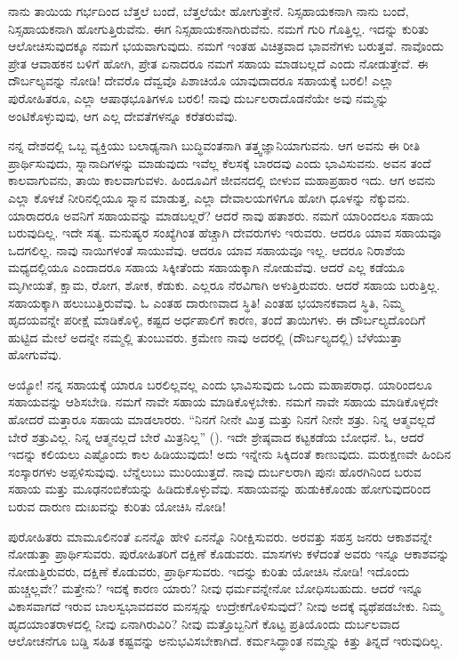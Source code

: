 ನಾನು ತಾಯಿಯ ಗರ್ಭದಿಂದ ಬೆತ್ತಲೆ ಬಂದೆ, ಬೆತ್ತಲೆಯೇ ಹೋಗುತ್ತೇನೆ. ನಿಸ್ಸಹಾಯಕನಾಗಿ ನಾನು ಬಂದೆ, ನಿಸ್ಸಹಾಯಕನಾಗಿ ಹೋಗುತ್ತಿರುವೆನು. ಈಗ ನಿಸ್ಸಹಾಯಕನಾಗಿರುವೆನು. ನಮಗೆ ಗುರಿ ಗೊತ್ತಿಲ್ಲ. ಇದನ್ನು ಕುರಿತು ಆಲೋಚಿಸುವುದಕ್ಕೂ ನಮಗೆ ಭಯವಾಗುವುದು. ನಮಗೆ ಇಂತಹ ವಿಚಿತ್ರವಾದ ಭಾವನೆಗಳು ಬರುತ್ತವೆ. ನಾವೊಂದು ಪ್ರೇತ ಆವಾಹಕನ ಬಳಿಗೆ ಹೋಗಿ, ಪ್ರೇತ ಏನಾದರೂ ನಮಗೆ ಸಹಾಯ ಮಾಡಬಲ್ಲದೆ ಎಂದು ನೋಡುತ್ತೇವೆ. ಈ ದೌರ್ಬಲ್ಯವನ್ನು ನೋಡಿ! ದೇವರೊ ದೆವ್ವವೊ ಪಿಶಾಚಿಯೊ ಯಾವುದಾದರೂ ಸಹಾಯಕ್ಕೆ ಬರಲಿ! ಎಲ್ಲಾ ಪುರೋಹಿತರೂ, ಎಲ್ಲಾ ಆಷಾಢಭೂತಿಗಳೂ ಬರಲಿ! ನಾವು ದುರ್ಬಲರಾದೊಡನೆಯೇ ಅವು ನಮ್ಮನ್ನು ಅಂಟಿಕೊಳ್ಳುವುವು, ಆಗ ಎಲ್ಲ ದೇವತೆಗಳನ್ನೂ ಕರೆತರುವೆವು.

ನನ್ನ ದೇಶದಲ್ಲಿ ಒಬ್ಬ ವ್ಯಕ್ತಿಯು ಬಲಾಢ್ಯನಾಗಿ ಬುದ್ಧಿವಂತನಾಗಿ ತತ್ತ್ವಜ್ಞಾನಿಯಾಗುವನು. ಆಗ ಅವನು ಈ ರೀತಿ ಪ್ರಾರ್ಥಿಸುವುದು, ಸ್ನಾನಾದಿಗಳನ್ನು ಮಾಡುವುದು ಇವೆಲ್ಲ ಕೆಲಸಕ್ಕೆ ಬಾರದವು ಎಂದು ಭಾವಿಸುವನು. ಅವನ ತಂದೆ ಕಾಲವಾಗುವನು, ತಾಯಿ ಕಾಲವಾಗುವಳು. ಹಿಂದೂವಿಗೆ ಜೀವನದಲ್ಲಿ ಬೀಳುವ ಮಹಾಪ್ರಹಾರ ಇದು. ಆಗ ಅವನು ಎಲ್ಲಾ ಕೊಳಚೆ ನೀರಿನಲ್ಲಿಯೂ ಸ್ನಾನ ಮಾಡುತ್ತ, ಎಲ್ಲಾ ದೇವಾಲಯಗಳಿಗೂ ಹೋಗಿ ಧೂಳನ್ನು ನೆಕ್ಕುವನು. ಯಾರಾದರೂ ಅವನಿಗೆ ಸಹಾಯವನ್ನು ಮಾಡಬಲ್ಲರೆ? ಆದರೆ ನಾವು ಹತಾಶರು. ನಮಗೆ ಯಾರಿಂದಲೂ ಸಹಾಯ ಬರುವುದಿಲ್ಲ. ಇದೇ ಸತ್ಯ. ಮನುಷ್ಯರ ಸಂಖ್ಯೆಗಿಂತ ಹೆಚ್ಚಾಗಿ ದೇವರುಗಳು ಇರುವರು. ಆದರೂ ಯಾವ ಸಹಾಯವೂ ಒದಗಲಿಲ್ಲ. ನಾವು ನಾಯಿಗಳಂತೆ ಸಾಯುವೆವು. ಆದರೂ ಯಾವ ಸಹಾಯವೂ ಇಲ್ಲ. ಆದರೂ ನಿರಾಶೆಯ ಮಧ್ಯದಲ್ಲಿಯೂ ಎಂದಾದರೂ ಸಹಾಯ ಸಿಕ್ಕೀತೆಂದು ಸಹಾಯಕ್ಕಾಗಿ ನೋಡುವೆವು. ಆದರೆ ಎಲ್ಲ ಕಡೆಯೂ ಮೃಗೀಯತೆ, ಕ್ಷಾಮ, ರೋಗ, ಶೋಕ, ಕೆಡುಕು. ಎಲ್ಲರೂ ನೆರವಿಗಾಗಿ ಅಳುತ್ತಿರುವರು. ಆದರೆ ಸಹಾಯ ಬರುತ್ತಿಲ್ಲ. ಸಹಾಯಕ್ಕಾಗಿ ಹಲುಬುತ್ತಿರುವೆವು. ಓ ಎಂತಹ ದಾರುಣವಾದ ಸ್ಥಿತಿ! ಎಂತಹ ಭಯಾನಕವಾದ ಸ್ಥಿತಿ, ನಿಮ್ಮ ಹೃದಯವನ್ನೇ ಪರೀಕ್ಷೆ ಮಾಡಿಕೊಳ್ಳಿ, ಕಷ್ಟದ ಅರ್ಧಪಾಲಿಗೆ ಕಾರಣ, ತಂದೆ ತಾಯಿಗಳು. ಈ ದೌರ್ಬಲ್ಯದೊಂದಿಗೆ ಹುಟ್ಟಿದ ಮೇಲೆ ಅದನ್ನೇ ನಮ್ಮಲ್ಲಿ ತುಂಬುವರು. ಕ್ರಮೇಣ ನಾವು ಅದರಲ್ಲಿ (ದೌರ್ಬಲ್ಯದಲ್ಲಿ) ಬೆಳೆಯುತ್ತಾ ಹೋಗುವೆವು.

ಅಯ್ಯೋ! ನನ್ನ ಸಹಾಯಕ್ಕೆ ಯಾರೂ ಬರಲಿಲ್ಲವಲ್ಲ ಎಂದು ಭಾವಿಸುವುದು ಒಂದು ಮಹಾಪರಾಧ. ಯಾರಿಂದಲೂ ಸಹಾಯವನ್ನು ಆಶಿಸಬೇಡಿ. ನಮಗೆ ನಾವೇ ಸಹಾಯ ಮಾಡಿಕೊಳ್ಳಬೇಕು. ನಮಗೆ ನಾವೇ ಸಹಾಯ ಮಾಡಿಕೊಳ್ಳದೇ ಹೋದರೆ ಮತ್ತಾರೂ ಸಹಾಯ ಮಾಡಲಾರರು. “ನಿನಗೆ ನೀನೇ ಮಿತ್ರ ಮತ್ತು ನಿನಗೆ ನೀನೇ ಶತ್ರು. ನಿನ್ನ ಆತ್ಮವಲ್ಲದೆ ಬೇರೆ ಶತ್ರುವಿಲ್ಲ. ನಿನ್ನ ಆತ್ಮನಲ್ಲದೆ ಬೇರೆ ಮಿತ್ರನಿಲ್ಲ” (). ಇದೇ ಶ್ರೇಷ್ಠವಾದ ಕಟ್ಟಕಡೆಯ ಬೋಧನೆ. ಓ, ಆದರೆ ಇದನ್ನು ಕಲಿಯಲು ಎಷ್ಟೊಂದು ಕಾಲ ಹಿಡಿಯುವುದು! ಅದು ಇನ್ನೇನು ಸಿಕ್ಕಿದಂತೆ ಕಾಣುವುದು. ಮರುಕ್ಷಣವೇ ಹಿಂದಿನ ಸಂಸ್ಕಾರಗಳು ಅಪ್ಪಳಿಸುವುವು. ಬೆನ್ನೆಲುಬು ಮುರಿಯುತ್ತದೆ. ನಾವು ದುರ್ಬಲರಾಗಿ ಪುನಃ ಹೊರಗಿನಿಂದ ಬರುವ ಸಹಾಯ ಮತ್ತು ಮೂಢನಂಬಿಕೆಯನ್ನು ಹಿಡಿದುಕೊಳ್ಳುವೆವು. ಸಹಾಯವನ್ನು ಹುಡುಕಿಕೊಂಡು ಹೋಗುವುದರಿಂದ ಬರುವ ದಾರುಣ ದುಃಖವನ್ನು ಕುರಿತು ಯೋಚಿಸಿ ನೋಡಿ!

ಪುರೋಹಿತರು ಮಾಮೂಲಿನಂತೆ ಏನನ್ನೊ ಹೇಳಿ ಏನನ್ನೊ ನಿರೀಕ್ಷಿಸುವರು. ಅರವತ್ತು ಸಹಸ್ರ ಜನರು ಆಕಾಶವನ್ನೇ ನೋಡುತ್ತಾ ಪ್ರಾರ್ಥಿಸುವರು. ಪುರೋಹಿತರಿಗೆ ದಕ್ಷಿಣೆ ಕೊಡುವರು. ಮಾಸಗಳು ಕಳೆದಂತೆ ಅವರು ಇನ್ನೂ ಆಕಾಶವನ್ನು ನೋಡುತ್ತಿರುವರು, ದಕ್ಷಿಣೆ ಕೊಡುವರು, ಪ್ರಾರ್ಥಿಸುವರು. ಇದನ್ನು ಕುರಿತು ಯೋಚಿಸಿ ನೋಡಿ! ಇದೊಂದು ಹುಚ್ಚಲ್ಲವೇ? ಮತ್ತೇನು? ಇದಕ್ಕೆ ಕಾರಣ ಯಾರು? ನೀವು ಧರ್ಮವನ್ನೇನೋ ಬೋಧಿಸಬಹುದು. ಆದರೆ ಇನ್ನೂ ವಿಕಾಸವಾಗದೆ ಇರುವ ಬಾಲಸ್ವಭಾವದವರ ಮನಸ್ಸನ್ನು ಉದ್ರೇಕಗೊಳಿಸುವುದೆ? ನೀವು ಅದಕ್ಕೆ ವ್ಯಥೆಪಡಬೇಕು. ನಿಮ್ಮ ಹೃದಯಾಂತರಾಳದಲ್ಲಿ ನೀವು ಏನಾಗಿರುವಿರಿ? ನೀವು ಮತ್ತೊಬ್ಬನಿಗೆ ಕೊಟ್ಟ ಪ್ರತಿಯೊಂದು ದುರ್ಬಲವಾದ ಆಲೋಚನೆಗೂ ಬಡ್ಡಿ ಸಹಿತ ಕಷ್ಟವನ್ನು ಅನುಭವಿಸಬೇಕಾಗಿದೆ. ಕರ್ಮಸಿದ್ಧಾಂತ ನಮ್ಮನ್ನು ಕಿತ್ತು ತಿನ್ನದೆ ಇರುವುದಿಲ್ಲ.

